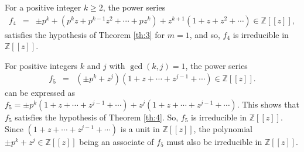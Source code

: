\documentclass[12pt,reqno]{amsart}%
\begin{document}
\begin{example}For a  positive integer $k\geq 2$, the power series
\begin{eqnarray*}
f_4 &=& \pm p^{k}+(p^{k}z+p^{k-1}z^2+\cdots+pz^{k})+z^{k+1}(1+z+z^2+\cdots)\in \mathbb{Z}[[z]],
\end{eqnarray*}
satisfies the hypothesis of Theorem \ref{th:3} for $m=1$, and so, $f_4$ is irreducible in $\mathbb{Z}[[z]]$.
\end{example}
\begin{example}
For positive integers $k$ and $j$ with $\gcd(k,j)=1$, the power series
\begin{eqnarray*}
f_5 &=&  (\pm p^{k}+z^j)(1+z+\cdots+z^{j-1}+\cdots)\in  \mathbb{Z}[[z]].
\end{eqnarray*}
can be expressed as $f_5=\pm p^{k}(1+z+\cdots+z^{j-1}+\cdots)+z^j(1+z+\cdots+z^{j-1}+\cdots)$. This
shows that $f_5$ satisfies the hypothesis of Theorem \ref{th:4}. So, $f_5$ is irreducible in   $\mathbb{Z}[[z]]$. Since $(1+z+\cdots+z^{j-1}+\cdots)$ is a unit in $\mathbb{Z}[[z]]$, the polynomial $\pm p^k+z^j\in \mathbb{Z}[[z]]$ being an associate of $f_5$ must also be irreducible in $\mathbb{Z}[[z]]$.
\end{example}
\end{document}
